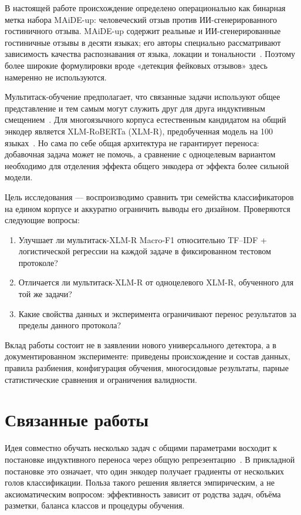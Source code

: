 \documentclass[11pt,a4paper]{article}
\begin{document}
В настоящей работе происхождение определено операционально как бинарная метка набора MAiDE-up: человеческий отзыв против ИИ-сгенерированного гостиничного отзыва. MAiDE-up содержит реальные и ИИ-сгенерированные гостиничные отзывы в десяти языках; его авторы специально рассматривают зависимость качества распознавания от языка, локации и тональности~\cite{ignat2025maide}. Поэтому более широкие формулировки вроде «детекция фейковых отзывов» здесь намеренно не используются.

Мультитаск-обучение предполагает, что связанные задачи используют общее представление и тем самым могут служить друг для друга индуктивным смещением~\cite{caruana1997multitask}. Для многоязычного корпуса естественным кандидатом на общий энкодер является XLM-RoBERTa (XLM-R), предобученная модель на 100 языках~\cite{conneau2020xlmr}. Но сама по себе общая архитектура не гарантирует переноса: добавочная задача может не помочь, а сравнение с одноцелевым вариантом необходимо для отделения эффекта общего энкодера от эффекта более сильной модели.

Цель исследования --- воспроизводимо сравнить три семейства классификаторов на едином корпусе и аккуратно ограничить выводы его дизайном. Проверяются следующие вопросы:
\begin{enumerate}[label=\textbf{RQ\arabic*.}, leftmargin=1.5cm]
  \item Улучшает ли мультитаск-XLM-R Macro-F1 относительно TF--IDF + логистической регрессии на каждой задаче в фиксированном тестовом протоколе?
  \item Отличается ли мультитаск-XLM-R от одноцелевого XLM-R, обученного для той же задачи?
  \item Какие свойства данных и эксперимента ограничивают перенос результатов за пределы данного протокола?
\end{enumerate}

Вклад работы состоит не в заявлении нового универсального детектора, а в документированном эксперименте: приведены происхождение и состав данных, правила разбиения, конфигурация обучения, многосидовые результаты, парные статистические сравнения и ограничения валидности.

\section{Связанные работы}

Идея совместно обучать несколько задач с общими параметрами восходит к постановке индуктивного переноса через общую репрезентацию~\cite{caruana1997multitask}. В прикладной постановке это означает, что один энкодер получает градиенты от нескольких голов классификации. Польза такого решения является эмпирическим, а не аксиоматическим вопросом: эффективность зависит от родства задач, объёма разметки, баланса классов и процедуры обучения.
\end{document}
